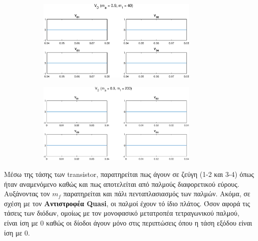 \begin{figure}[h]
	\begin{subfigure}{0.49\textwidth}
		\centering
		\includegraphics[width=0.85\textwidth]{Images/V_D_40}
	\end{subfigure}
	\begin{subfigure}{0.49\textwidth}
		\centering
		\includegraphics[width=0.85\textwidth]{Images/V_D_200}
	\end{subfigure}
\end{figure}
\noindent
Μέσω της τάσης των transistor, παρατηρείται πως άγουν σε ζεύγη (1-2 και 3-4) όπως ήταν αναμενόμενο καθώς και πως αποτελείται από παλμούς διαφορετικού εύρους. Αυξάνοντας τον $m_f$ παρατηρείται και πάλι πενταπλασιασμός των παλμών. Ακόμα, σε σχέση με τον \textbf{Αντιστροφέα Quasi}, οι παλμοί έχουν τό ίδιο πλάτος. Όσον αφορά τις τάσεις των διόδων, ομοίως με τον μονοφασικό μετατροπέα τετραγωνικού παλμού, είναι ίση με 0 καθώς οι δίοδοι άγουν μόνο στις περιπτώσεις όπου η τάση εξόδου είναι ίση με 0.

